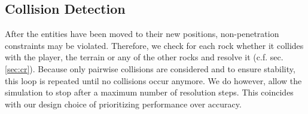 

\subsection{Collision Detection}

After the entities have been moved to their new positions, non-penetration constraints may be violated.
Therefore, we check for each rock whether it collides with the player, the terrain or any of the other rocks and resolve it (c.f. sec. \ref{sec:cr}).
Because only pairwise collisions are considered and to ensure stability, this loop is repeated until no collisions occur anymore.
We do however, allow the simulation to stop after a maximum number of resolution steps.
This coincides with our design choice of prioritizing performance over accuracy. 
%

